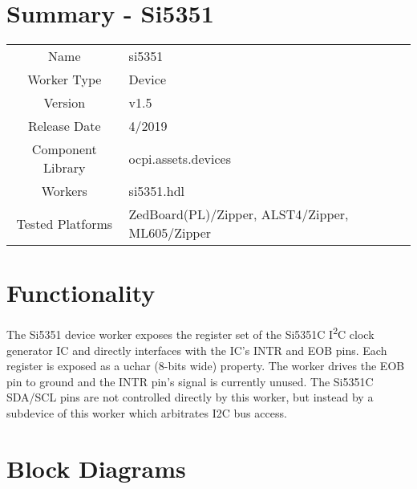\documentclass{article}
\author{} %
\date{Version \docVersion} %
\title{\docTitle}
\def\docVersion{1.5}
\def\comp{temp}
\def\comp{si5351}
\def\Comp{TEMP}
\def\Comp{Si5351 }
\begin{document}
\section*{Summary - \Comp}
\begin{tabular}{|c|M{13.5cm}|}
	\hline
	                  &                                                                                \\
	\hline
	Name              & \comp                                                                          \\
	\hline
	Worker Type       & Device                                                                         \\
	\hline
	Version           &  v\docVersion \\
	\hline
	Release Date      &  4/2019 \\
	\hline
	Component Library &  ocpi.assets.devices \\
	\hline
	Workers           &  \comp.hdl \\
	\hline
	Tested Platforms  &  ZedBoard(PL)/Zipper, ALST4/Zipper, ML605/Zipper\\
	\hline
\end{tabular}

\section*{Functionality}
\begin{flushleft}
The \Comp{} device worker exposes the register set of the Si5351C I\textsuperscript{2}C clock generator IC\cite{siliconlabsdatasheet} and directly interfaces with the IC's INTR and EOB pins. Each register is exposed as a uchar (8-bits wide) property. The worker drives the EOB pin to ground and the INTR pin's signal is currently unused. The Si5351C SDA/SCL pins are not controlled directly by this worker, but instead by a subdevice of this worker which arbitrates I2C bus access. \\
\end{flushleft}

\section*{Block Diagrams}
\end{document}
